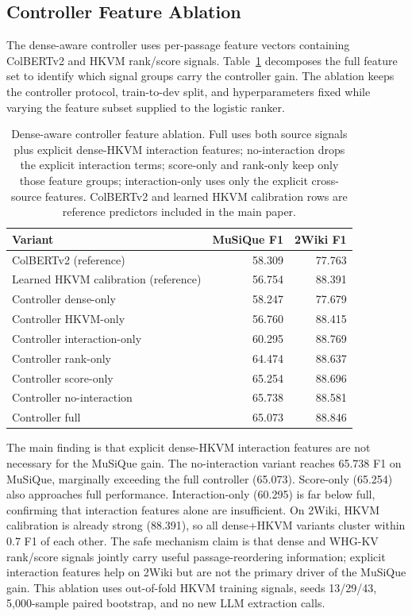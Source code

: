 \documentclass[conference]{IEEEtran}
\begin{document}
\subsection{Controller Feature Ablation}

The dense-aware controller uses per-passage feature vectors containing ColBERTv2 and HKVM rank/score signals. Table~\ref{tab:supp_controller_ablation} decomposes the full feature set to identify which signal groups carry the controller gain. The ablation keeps the controller protocol, train-to-dev split, and hyperparameters fixed while varying the feature subset supplied to the logistic ranker.

\begin{table}[t]
\caption{Dense-aware controller feature ablation. Full uses both source signals plus explicit dense-HKVM interaction features; no-interaction drops the explicit interaction terms; score-only and rank-only keep only those feature groups; interaction-only uses only the explicit cross-source features. ColBERTv2 and learned HKVM calibration rows are reference predictors included in the main paper.}
\label{tab:supp_controller_ablation}
\centering
\scriptsize
\begin{tabular}{lrr}
\toprule
Variant & MuSiQue F1 & 2Wiki F1 \\
\midrule
ColBERTv2 (reference) & 58.309 & 77.763 \\
Learned HKVM calibration (reference) & 56.754 & 88.391 \\
\midrule
Controller dense-only & 58.247 & 77.679 \\
Controller HKVM-only & 56.760 & 88.415 \\
Controller interaction-only & 60.295 & 88.769 \\
Controller rank-only & 64.474 & 88.637 \\
Controller score-only & 65.254 & 88.696 \\
Controller no-interaction & 65.738 & 88.581 \\
Controller full & 65.073 & 88.846 \\
\bottomrule
\end{tabular}
\end{table}

The main finding is that explicit dense-HKVM interaction features are not necessary for the MuSiQue gain. The no-interaction variant reaches 65.738 F1 on MuSiQue, marginally exceeding the full controller (65.073). Score-only (65.254) also approaches full performance. Interaction-only (60.295) is far below full, confirming that interaction features alone are insufficient. On 2Wiki, HKVM calibration is already strong (88.391), so all dense+HKVM variants cluster within 0.7 F1 of each other. The safe mechanism claim is that dense and WHG-KV rank/score signals jointly carry useful passage-reordering information; explicit interaction features help on 2Wiki but are not the primary driver of the MuSiQue gain. This ablation uses out-of-fold HKVM training signals, seeds 13/29/43, 5,000-sample paired bootstrap, and no new LLM extraction calls.
\end{document}
